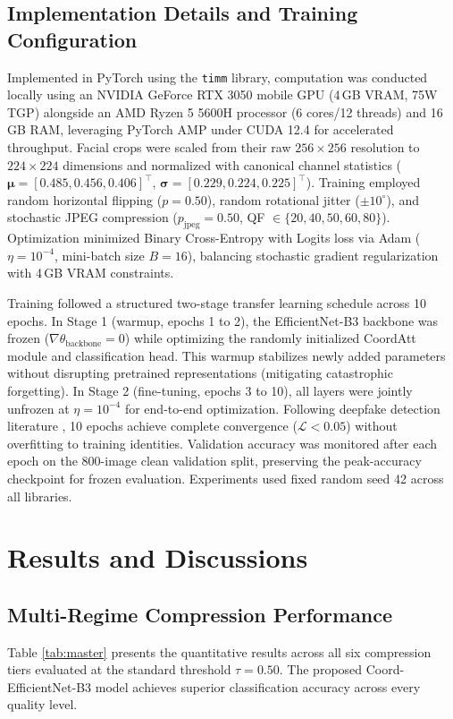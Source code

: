 \documentclass[conference]{IEEEtran}
\begin{document}
\subsection{Implementation Details and Training Configuration}
Implemented in PyTorch using the \texttt{timm} library, computation was conducted locally using an NVIDIA GeForce RTX 3050 mobile GPU (4\,GB VRAM, 75W TGP) alongside an AMD Ryzen 5 5600H processor (6 cores/12 threads) and 16\,GB RAM, leveraging PyTorch AMP under CUDA 12.4 for accelerated throughput. Facial crops were scaled from their raw $256 \times 256$ resolution to $224 \times 224$ dimensions and normalized with canonical channel statistics ($\boldsymbol{\mu} = [0.485, 0.456, 0.406]^\top$, $\boldsymbol{\sigma} = [0.229, 0.224, 0.225]^\top$). Training employed random horizontal flipping ($p = 0.50$), random rotational jitter ($\pm 10^\circ$), and stochastic JPEG compression ($p_{\text{jpeg}} = 0.50$, QF $\in \{20, 40, 50, 60, 80\}$). Optimization minimized Binary Cross-Entropy with Logits loss via Adam ($\eta = 10^{-4}$, mini-batch size $B = 16$), balancing stochastic gradient regularization with 4\,GB VRAM constraints.

Training followed a structured two-stage transfer learning schedule across 10 epochs. In Stage 1 (warmup, epochs 1 to 2), the EfficientNet-B3 backbone was frozen ($\nabla \theta_{\text{backbone}} = 0$) while optimizing the randomly initialized CoordAtt module and classification head. This warmup stabilizes newly added parameters without disrupting pretrained representations (mitigating catastrophic forgetting). In Stage 2 (fine-tuning, epochs 3 to 10), all layers were jointly unfrozen at $\eta = 10^{-4}$ for end-to-end optimization. Following deepfake detection literature \cite{deepa2026enhanced}, 10 epochs achieve complete convergence ($\mathcal{L} < 0.05$) without overfitting to training identities. Validation accuracy was monitored after each epoch on the 800-image clean validation split, preserving the peak-accuracy checkpoint for frozen evaluation. Experiments used fixed random seed 42 across all libraries.

\section{Results and Discussions}

\subsection{Multi-Regime Compression Performance}
Table \ref{tab:master} presents the quantitative results across all six compression tiers evaluated at the standard threshold $\tau = 0.50$. The proposed Coord-EfficientNet-B3 model achieves superior classification accuracy across every quality level.
\end{document}
